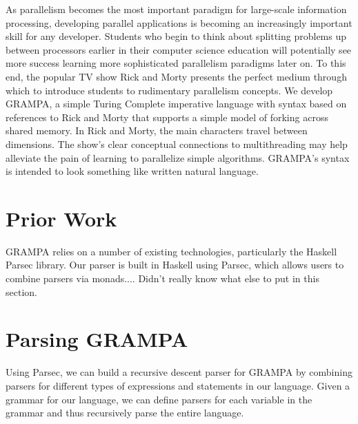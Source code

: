 \documentclass[preprint]{sigplanconf}
\begin{document}
As parallelism becomes the most important paradigm for large-scale information processing, developing parallel applications is becoming an increasingly important skill for any developer. Students who begin to think about splitting problems up between processors earlier in their computer science education will potentially see more success learning more sophisticated parallelism paradigms later on. To this end, the popular TV show Rick and Morty presents the perfect medium through which to introduce students to rudimentary parallelism concepts. We develop GRAMPA, a simple Turing Complete imperative language with syntax based on references to Rick and Morty that supports a simple model of forking across shared memory. In Rick and Morty, the main characters travel between dimensions. The show's clear conceptual connections to multithreading may help alleviate the pain of learning to parallelize simple algorithms. GRAMPA's syntax is intended to look something like written natural language.

\section{Prior Work}

GRAMPA relies on a number of existing technologies, particularly the Haskell Parsec library. Our parser is built in Haskell using Parsec, which allows users to combine parsers via monads.... Didn't really know what else to put in this section.

\section{Parsing GRAMPA}

Using Parsec, we can build a recursive descent parser for GRAMPA by combining parsers for different types of expressions and statements in our language. Given a grammar for our language, we can define parsers for each variable in the grammar and thus recursively parse the entire language.
\end{document}
